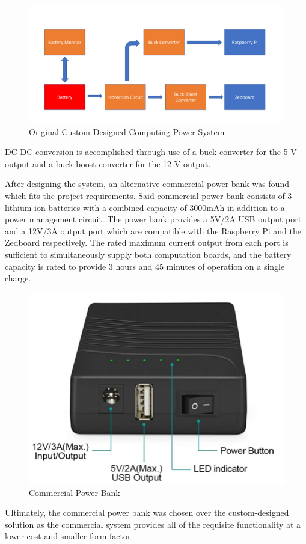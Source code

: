 \begin{figure}[H]
\centering
\includegraphics[width=15cm]{img/Power_Diagram.png}
\caption{Original Custom-Designed Computing Power System}
\label{powerdiag}
\end{figure}

DC-DC conversion is accomplished through use of a buck converter for the 5 V output and a buck-boost converter for the 12 V output.

After designing the system, an alternative commercial power bank was found which fits the project requirements. Said commercial power bank consists of 3 lithium-ion batteries with a combined capacity of 3000mAh in addition to a power management circuit. The power bank provides a 5V/2A USB output port and a 12V/3A output port which are compatible with the Raspberry Pi and the Zedboard respectively. The rated maximum current output from each port is sufficient to simultaneously supply both computation boards, and the battery capacity is rated to provide 3 hours and 45 minutes of operation on a single charge.

\begin{figure}[H]
\centering
\includegraphics[width=12cm]{img/power_bank.png}
\caption{Commercial Power Bank}
\label{powerbank}
\end{figure}

Ultimately, the commercial power bank was chosen over the custom-designed solution as the commercial system provides all of the requisite functionality at a lower cost and smaller form factor.